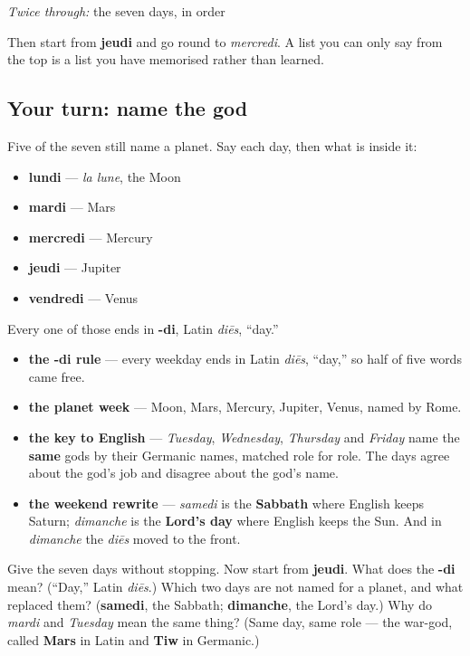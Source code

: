 \emph{Twice through:} the seven days, in order

Then start from \textbf{jeudi} and go round to \emph{mercredi}. A list you can only say from the top is a list you have memorised rather than learned.

\subsection*{Your turn: name the god}
Five of the seven still name a planet. Say each day, then what is inside it:

\begin{itemize}
\raggedright
  \item \textbf{lundi} — \emph{la lune}, the Moon
  \item \textbf{mardi} — Mars
  \item \textbf{mercredi} — Mercury
  \item \textbf{jeudi} — Jupiter
  \item \textbf{vendredi} — Venus
\end{itemize}

Every one of those ends in \textbf{-di}, Latin \emph{diēs}, \textquotedblleft{}day.\textquotedblright{}

\begin{grammarlens}[title={What you've built this chapter}]
\begin{itemize}
\raggedright
  \item \textbf{the -di rule} — every weekday ends in Latin \emph{diēs}, \textquotedblleft{}day,\textquotedblright{} so half of five words came free.
  \item \textbf{the planet week} — Moon, Mars, Mercury, Jupiter, Venus, named by Rome.
  \item \textbf{the key to English} — \emph{Tuesday}, \emph{Wednesday}, \emph{Thursday} and \emph{Friday} name the \textbf{same} gods by their Germanic names, matched role for role. The days agree about the god's job and disagree about the god's name.
  \item \textbf{the weekend rewrite} — \emph{samedi} is the \textbf{Sabbath} where English keeps Saturn; \emph{dimanche} is the \textbf{Lord's day} where English keeps the Sun. And in \emph{dimanche} the \emph{diēs} moved to the front.
\end{itemize}
\end{grammarlens}

\begin{tcolorbox}[breakable,colback=teal!4,colframe=teal!35!black,title={Before you move on}]
Give the seven days without stopping. Now start from \textbf{jeudi}. What does the \textbf{-di} mean? (\textquotedblleft{}Day,\textquotedblright{} Latin \emph{diēs}.) Which two days are not named for a planet, and what replaced them? (\textbf{samedi}, the Sabbath; \textbf{dimanche}, the Lord's day.) Why do \emph{mardi} and \emph{Tuesday} mean the same thing? (Same day, same role — the war-god, called \textbf{Mars} in Latin and \textbf{Tiw} in Germanic.)
\end{tcolorbox}

